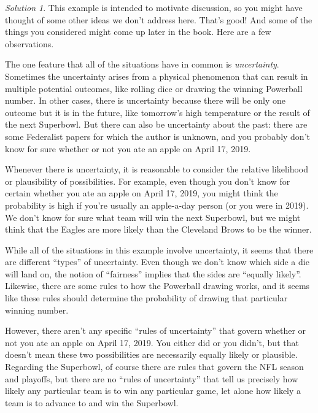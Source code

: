 \documentclass[
  letterpaper,
  DIV=11,
  numbers=noendperiod]{scrreprt}
\theoremstyle{plain}
\theoremstyle{definition}
\theoremstyle{definition}
\theoremstyle{definition}
\theoremstyle{remark}
\newtheorem{refsolution}{Solution}[chapter]
\begin{document}
\begin{tcolorbox}[enhanced jigsaw, opacityback=0, rightrule=.15mm, coltitle=black, colframe=quarto-callout-tip-color-frame, toprule=.15mm, colbacktitle=quarto-callout-tip-color!10!white, opacitybacktitle=0.6, left=2mm, toptitle=1mm, breakable, title={Solution (click to expand)}, bottomtitle=1mm, colback=white, leftrule=.75mm, titlerule=0mm, arc=.35mm, bottomrule=.15mm]

\begin{refsolution}
This example is intended to motivate discussion, so you might have
thought of some other ideas we don't address here. That's good! And some
of the things you considered might come up later in the book. Here are a
few observations.

The one feature that all of the situations have in common is
\emph{uncertainty}. Sometimes the uncertainty arises from a physical
phenomenon that can result in multiple potential outcomes, like rolling
dice or drawing the winning Powerball number. In other cases, there is
uncertainty because there will be only one outcome but it is in the
future, like tomorrow's high temperature or the result of the next
Superbowl. But there can also be uncertainty about the past: there are
some Federalist papers for which the author is unknown, and you probably
don't know for sure whether or not you ate an apple on April 17, 2019.

Whenever there is uncertainty, it is reasonable to consider the relative
likelihood or plausibility of possibilities. For example, even though
you don't know for certain whether you ate an apple on April 17, 2019,
you might think the probability is high if you're usually an apple-a-day
person (or you were in 2019). We don't know for sure what team will win
the next Superbowl, but we might think that the Eagles are more likely
than the Cleveland Brows to be the winner.

While all of the situations in this example involve uncertainty, it
seems that there are different ``types'' of uncertainty. Even though we
don't know which side a die will land on, the notion of ``fairness''
implies that the sides are ``equally likely''. Likewise, there are some
rules to how the Powerball drawing works, and it seems like these rules
should determine the probability of drawing that particular winning
number.

However, there aren't any specific ``rules of uncertainty'' that govern
whether or not you ate an apple on April 17, 2019. You either did or you
didn't, but that doesn't mean these two possibilities are necessarily
equally likely or plausible. Regarding the Superbowl, of course there
are rules that govern the NFL season and playoffs, but there are no
``rules of uncertainty'' that tell us precisely how likely any
particular team is to win any particular game, let alone how likely a
team is to advance to and win the Superbowl.


\end{refsolution}
\end{tcolorbox}
\end{document}
